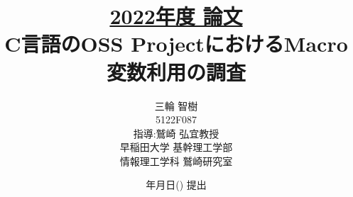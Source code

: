 \newcommand{\yourtitle}{C言語のOSS ProjectにおけるMacro変数利用の調査}
\newcommand{\yourname}{三輪 智樹}
\newcommand{\yourstudentid}{5122F087}
\newcommand{\yourdate}{年月日() 提出}

\title{\underline{2022年度 論文}\\\yourtitle}
\author{\yourname\\\yourstudentid\bigskip\\指導:鷲崎 弘宜教授\bigskip\\早稲田大学 基幹理工学部\\情報理工学科 鷲崎研究室}
\date{\yourdate}

\maketitle